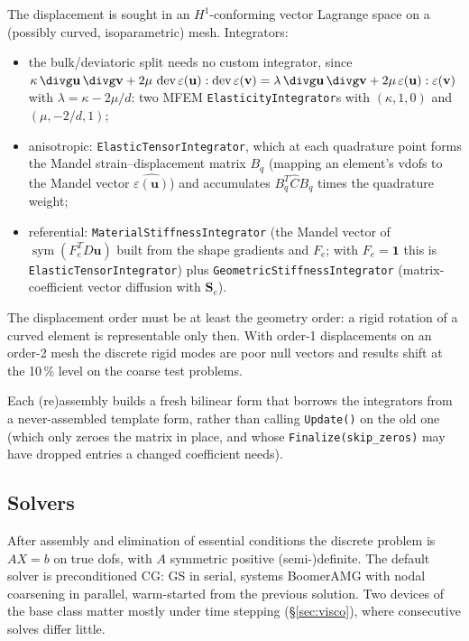 \documentclass[11pt]{article}
\numberwithin{equation}{section}
\theoremstyle{remark}
\newcommand{\eps}{\varepsilon}
\newcommand{\sym}{\operatorname{sym}}
\newcommand{\dev}{\operatorname{dev}}
\newcommand{\vu}{\mathbf{u}}
\newcommand{\vv}{\mathbf{v}}
\newcommand{\Se}{\mathbf{S}_e}
\newcommand{\code}[1]{\texttt{#1}}
\begin{document}
The displacement is sought in an $H^1$-conforming vector Lagrange space
on a (possibly curved, isoparametric) mesh. Integrators:
\begin{itemize}
\item the bulk/deviatoric split needs no custom integrator, since
  $\kappa\,\divg\vu\,\divg\vv + 2\mu\,\dev\eps(\vu):\dev\eps(\vv) =
  \lambda\,\divg\vu\,\divg\vv + 2\mu\,\eps(\vu):\eps(\vv)$ with
  $\lambda = \kappa - 2\mu/d$: two MFEM \code{ElasticityIntegrator}s with
  $(\kappa, 1, 0)$ and $(\mu, -2/d, 1)$;
\item anisotropic: \code{ElasticTensorIntegrator}, which at each
  quadrature point forms the Mandel strain--displacement matrix $B_q$
  (mapping an element's vdofs to the Mandel vector $\widehat{\eps(\vu)}$)
  and accumulates $B_q^T\hat C B_q$ times the quadrature weight;
\item referential: \code{MaterialStiffnessIntegrator} (the Mandel vector of
  $\sym(F_e^TD\vu)$ built from the shape gradients and $F_e$; with
  $F_e = \mathbf{1}$ this is \code{ElasticTensorIntegrator}) plus
  \code{GeometricStiffnessIntegrator} (matrix-coefficient vector
  diffusion with $\Se$).
\end{itemize}
The displacement order must be at least the geometry order: a rigid
rotation of a curved element is representable only then. With order-1
displacements on an order-2 mesh the discrete rigid modes are poor null
vectors and results shift at the 10\,\% level on the coarse test problems.

Each (re)assembly builds a fresh bilinear form that borrows the
integrators from a never-assembled template form, rather than calling
\code{Update()} on the old one (which only zeroes the matrix in place, and
whose \code{Finalize(skip\_zeros)} may have dropped entries a changed
coefficient needs).

\subsection{Solvers}

After assembly and elimination of essential conditions the discrete
problem is $AX = b$ on true dofs, with $A$ symmetric positive
(semi-)definite. The default solver is preconditioned CG: GS in serial,
systems BoomerAMG with nodal coarsening in parallel, warm-started from the
previous solution. Two devices of the base class matter mostly under time
stepping (\S\ref{sec:visco}), where consecutive solves differ little.
\end{document}
